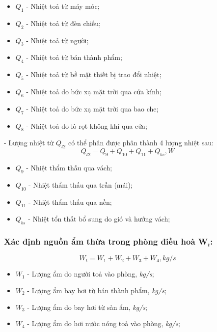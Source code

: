 \begin{itemize}[leftmargin = 3cm, label = $\ast$]
	\item $Q_{1}$ - Nhiệt toả từ máy móc;
	\item $Q_{2}$ - Nhiệt toả từ đèn chiếu;
	\item $Q_{3}$ - Nhiệt toả từ người;
	\item $Q_{4}$ - Nhiệt toả từ bán thành phẩm;
	\item $Q_{5}$ - Nhiệt toả từ bề mặt thiết bị trao đổi nhiệt;
	\item $Q_{6}$ - Nhiệt toả do bức xạ mặt trời qua cửa kính;
	\item $Q_{7}$ - Nhiệt toả do bức xạ mặt trời qua bao che;
	\item $Q_{8}$ - Nhiệt toả do lò rọt không khí qua cửa;
\end{itemize}

- Lượng nhiệt từ $ Q_{t2} $ có thể phân được phân thành 4 lượng nhiệt sau:
\begin{equation}
	Q_{t2} = Q_{9} + Q_{10} + Q_{11} + Q_{bs}, \textit{W}
\end{equation}

\begin{itemize}[leftmargin = 3cm, label = $\ast$]
	\item $ Q_{9} $ - Nhiệt thẩm thấu qua vách;
	\item $ Q_{10} $ - Nhiệt thẩm thấu qua trần (mái);
	\item $ Q_{11} $ - Nhiệt thẩm thấu qua nền;
	\item $ Q_{bs} $ - Nhiệt tổn thất bổ sung do gió và hướng vách;
\end{itemize}


\subsubsection{Xác định nguồn ẩm thừa trong phòng điều hoà W$ _{t} $:}
\begin{equation}
	W_{t} = W_{1} + W_{2} + W_{3} + W_{4}, kg/s
\end{equation}

\begin{itemize}[leftmargin = 3cm, label = $\ast$]
	\item $ W_{1} $ - Lượng ẩm do người toả vào phòng, \textit{kg/s};
	\item $ W_{2} $ - Lượng ẩm bay hơi từ bán thành phẩm, \textit{kg/s};
	\item $ W_{3} $ - Lượng ẩm do bay hơi từ sàn ẩm, \textit{kg/s};
	\item $ W_{4} $ - Lượng ẩm do hơi nước nóng toả vào phòng, \textit{kg/s};	
\end{itemize}
	
